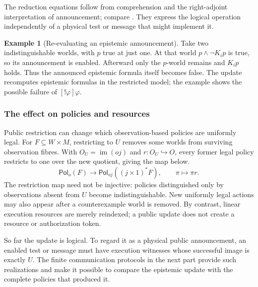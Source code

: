 \documentclass[11pt,a4paper]{article}
\numberwithin{equation}{section}
\theoremstyle{definition}
\newtheorem{example}[theorem]{Example}
\theoremstyle{remark}
\theoremstyle{plain}
\providecommand{\Pol}{\mathsf{Pol}}
\providecommand{\im}{\mathop{\mathrm{im}}}
\begin{document}
The reduction equations follow from comprehension and the
right-adjoint interpretation of announcement; compare
\citet{Plaza2007PublicCommunications,BaltagMossSolecki1998PublicAnnouncements}.
They express the logical operation independently of a physical test or
message that might implement it.

\begin{example}[Re-evaluating an epistemic announcement]
Take two indistinguishable worlds, with $p$ true at just one. At that world
$p\wedge\neg K_ip$ is true, so its announcement is enabled. Afterward only
the $p$-world remains and $K_ip$ holds. Thus the announced epistemic formula
itself becomes false. The update recomputes epistemic formulas in the restricted model; the example shows the possible failure of $[!\varphi]\varphi$.
\end{example}

\subsubsection{The effect on policies and resources}

Public restriction can change which observation-based policies are
uniformly legal. For $F\subseteq W\times M$, restricting to $U$
removes some worlds from surviving observation fibres. With
$O_U=\im(oj)$ and $r:O_U\hookrightarrow O$, every former legal
policy restricts to one over the new quotient, giving the map below.
\[
 \Pol_o(F)\longrightarrow\Pol_{oj}((j\times1)^*F),\qquad
 \pi\longmapsto\pi r.
\]
The restriction map need not be injective: policies distinguished
only by observations absent from $U$ become indistinguishable. New
uniformly legal actions may also appear after a counterexample world is
removed. By contrast, linear execution resources are merely reindexed;
a public update does not create a resource or authorization token.

So far the update is logical. To regard it as a physical public
announcement, an enabled test or message must have execution witnesses
whose successful image is exactly $U$. The finite communication protocols
in the next part provide such realizations and make it possible to compare
the epistemic update with the complete policies that produced it.
\end{document}
